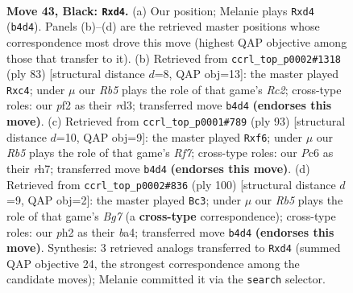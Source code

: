 \documentclass[11pt]{article}
\begin{document}
\clearpage

\begin{figure}[p]\centering
\begin{subfigure}{0.46\textwidth}\centering
\resizebox{\linewidth}{!}{%
\newchessgame
\chessboard[
  setfen={8/p2p3k/2p2K2/8/1r1P4/8/5P1P/8 b - - 0 43},
  showmover=false,
  pgfstyle=straightmove, color=movearrow, markmove={b4-d4}
]}
\caption{}
\end{subfigure}\hfill
\begin{subfigure}{0.46\textwidth}\centering
\resizebox{\linewidth}{!}{%
\newchessgame
\chessboard[
  setfen={8/2r5/p7/P4p2/2P4k/3R4/8/4K3 b - - 0 42},
  showmover=false,
  pgfstyle=straightmove, color=movearrow, markmove={c7-c4}
]}
\caption{}
\end{subfigure}
\\[4pt]
\begin{subfigure}{0.46\textwidth}\centering
\resizebox{\linewidth}{!}{%
\newchessgame
\chessboard[
  setfen={8/7R/3k1Pp1/1p6/8/2K3PP/5r2/8 b - - 0 47},
  showmover=false,
  pgfstyle=straightmove, color=movearrow, markmove={f2-f6}
]}
\caption{}
\end{subfigure}\hfill
\begin{subfigure}{0.46\textwidth}\centering
\resizebox{\linewidth}{!}{%
\newchessgame
\chessboard[
  setfen={8/6B1/p7/5k1p/bP6/P7/5K1P/8 w - - 1 51},
  showmover=false,
  pgfstyle=straightmove, color=movearrow, markmove={g7-c3}
]}
\caption{}
\end{subfigure}
\caption{\textbf{Move 43, Black: \texttt{Rxd4}.} (a) Our position; Melanie plays \texttt{Rxd4} (\texttt{b4d4}). Panels (b)--(d) are the retrieved master positions whose correspondence most drove this move (highest QAP objective among those that transfer to it). (b) Retrieved from \texttt{ccrl\_top\_p0002\#1318} (ply 83) [structural distance $d$=8, QAP obj=13]: the master played \texttt{Rxc4}; under $\mu$ our \emph{Rb5} plays the role of that game's \emph{Rc2}; cross-type roles: our \emph{p}f2 as their \emph{r}d3; transferred move \texttt{b4d4} \textbf{(endorses this move)}. (c) Retrieved from \texttt{ccrl\_top\_p0001\#789} (ply 93) [structural distance $d$=10, QAP obj=9]: the master played \texttt{Rxf6}; under $\mu$ our \emph{Rb5} plays the role of that game's \emph{Rf7}; cross-type roles: our \emph{P}c6 as their \emph{r}h7; transferred move \texttt{b4d4} \textbf{(endorses this move)}. (d) Retrieved from \texttt{ccrl\_top\_p0002\#836} (ply 100) [structural distance $d$=9, QAP obj=2]: the master played \texttt{Bc3}; under $\mu$ our \emph{Rb5} plays the role of that game's \emph{Bg7} (a \textbf{cross-type} correspondence); cross-type roles: our \emph{p}h2 as their \emph{b}a4; transferred move \texttt{b4d4} \textbf{(endorses this move)}. Synthesis: 3 retrieved analogs transferred to \texttt{Rxd4} (summed QAP objective 24, the strongest correspondence among the candidate moves); Melanie committed it via the \texttt{search} selector.}
\label{fig:thought-m85}
\end{figure}
\end{document}
